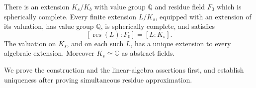 \begin{proposition}\label{prop:spherical-base}
There is an extension $K_s/K_b$ with value group $\mathbb Q$ and residue
field $F_0$ which is spherically complete.  Every finite extension
$L/K_s$, equipped with an extension of its valuation, has value group
$\mathbb Q$, is spherically complete, and satisfies
\begin{equation}\label{eq:full-residue-degree}
                   [\operatorname{res}(L):F_0]=[L:K_s].
\end{equation}
The valuation on $K_s$, and on each such $L$, has a unique extension to
every algebraic extension.  Moreover
$\overline{K_s}\simeq\mathbb C$ as abstract fields.
\end{proposition}

We prove the construction and the linear-algebra assertions first, and
establish uniqueness after proving simultaneous residue approximation.

